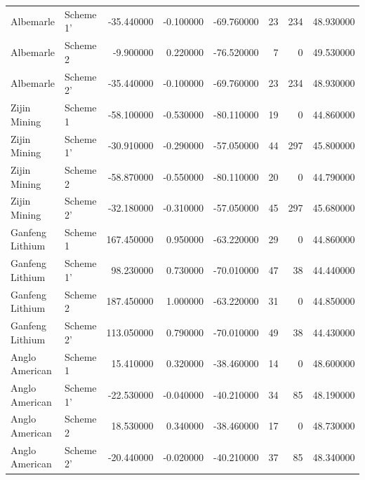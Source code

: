 \begin{longtable}{llrrrrrr}
Albemarle & Scheme 1' & -35.440000 & -0.100000 & -69.760000 & 23 & 234 & 48.930000 \\
Albemarle & Scheme 2 & -9.900000 & 0.220000 & -76.520000 & 7 & 0 & 49.530000 \\
Albemarle & Scheme 2' & -35.440000 & -0.100000 & -69.760000 & 23 & 234 & 48.930000 \\
Zijin Mining & Scheme 1 & -58.100000 & -0.530000 & -80.110000 & 19 & 0 & 44.860000 \\
Zijin Mining & Scheme 1' & -30.910000 & -0.290000 & -57.050000 & 44 & 297 & 45.800000 \\
Zijin Mining & Scheme 2 & -58.870000 & -0.550000 & -80.110000 & 20 & 0 & 44.790000 \\
Zijin Mining & Scheme 2' & -32.180000 & -0.310000 & -57.050000 & 45 & 297 & 45.680000 \\
Ganfeng Lithium & Scheme 1 & 167.450000 & 0.950000 & -63.220000 & 29 & 0 & 44.860000 \\
Ganfeng Lithium & Scheme 1' & 98.230000 & 0.730000 & -70.010000 & 47 & 38 & 44.440000 \\
Ganfeng Lithium & Scheme 2 & 187.450000 & 1.000000 & -63.220000 & 31 & 0 & 44.850000 \\
Ganfeng Lithium & Scheme 2' & 113.050000 & 0.790000 & -70.010000 & 49 & 38 & 44.430000 \\
Anglo American & Scheme 1 & 15.410000 & 0.320000 & -38.460000 & 14 & 0 & 48.600000 \\
Anglo American & Scheme 1' & -22.530000 & -0.040000 & -40.210000 & 34 & 85 & 48.190000 \\
Anglo American & Scheme 2 & 18.530000 & 0.340000 & -38.460000 & 17 & 0 & 48.730000 \\
Anglo American & Scheme 2' & -20.440000 & -0.020000 & -40.210000 & 37 & 85 & 48.340000 \\
\end{longtable}
